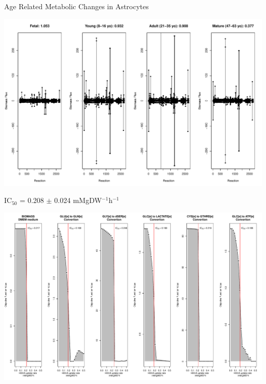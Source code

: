 \documentclass[11pt]{beamer}
\begin{document}
\begin{frame}{Age Related Metabolic Changes in Astrocytes}
\begin{center}
\includegraphics[width=\textwidth]{Astrocyte_MetabolicChanges}
\end{center}
\end{frame}
\begin{frame}{IC$_{50}$ = 0.208 $\pm$ 0.024 mMgDW$^{-1}$h$^{-1}$}
\begin{center}
\includegraphics[width=\textwidth]{IC50}
\end{center}
\end{frame}
\end{document}
